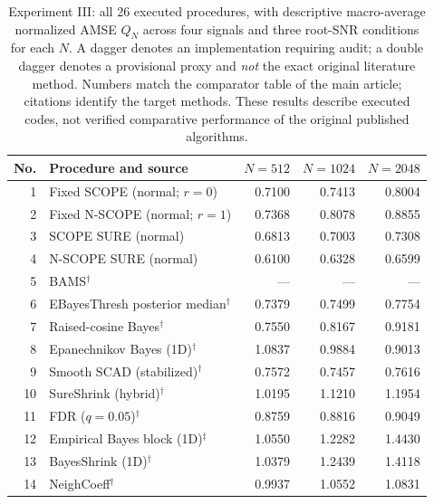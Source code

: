 \documentclass[11pt]{article}
\numberwithin{equation}{section}
\begin{document}
\begin{table}[H]
\centering\small
\caption{Experiment III: all 26 executed procedures, with descriptive macro-average normalized AMSE $Q_N$ across four signals and three root-SNR conditions for each $N$. A dagger denotes an implementation requiring audit; a double dagger denotes a provisional proxy and \emph{not} the exact original literature method. Numbers match the comparator table of the main article; citations identify the target methods. These results describe executed codes, not verified comparative performance of the original published algorithms.}
\label{tab:s5-e3-ranking}
\setlength{\tabcolsep}{5pt}
\begin{tabular}{r p{.58\linewidth}rrr}
\toprule
No. & Procedure and source & $N=512$ & $N=1024$ & $N=2048$ \\
\midrule
1 & Fixed SCOPE (normal; $r=0$) & 0.7100 & 0.7413 & 0.8004 \\
2 & Fixed N-SCOPE (normal; $r=1$) & 0.7368 & 0.8078 & 0.8855 \\
3 & SCOPE SURE (normal) & 0.6813 & 0.7003 & 0.7308 \\
4 & N-SCOPE SURE (normal) & 0.6100 & 0.6328 & 0.6599 \\
5 & BAMS$^{\dagger}$ \citep{VidakovicRuggeri2001} & --- & --- & --- \\
6 & EBayesThresh posterior median$^{\dagger}$ \citep{JohnstoneSilverman2005EBayes} & 0.7379 & 0.7499 & 0.7754 \\
7 & Raised-cosine Bayes$^{\dagger}$ \citep{ReinaSousa2026RaisedCosine} & 0.7550 & 0.8167 & 0.9181 \\
8 & Epanechnikov Bayes (1D)$^{\dagger}$ \citep{BarriosSousa2025Epanechnikov} & 1.0837 & 0.9884 & 0.9013 \\
9 & Smooth SCAD (stabilized)$^{\dagger}$ \citep{KulkarniEtAl2026SmoothSCAD} & 0.7572 & 0.7457 & 0.7616 \\
10 & SureShrink (hybrid)$^{\dagger}$ \citep{DonohoJohnstone1995} & 1.0195 & 1.1210 & 1.1954 \\
11 & FDR ($q=0.05$)$^{\dagger}$ \citep{AbramovichEtAl2006FDR} & 0.8759 & 0.8816 & 0.9049 \\
12 & Empirical Bayes block (1D)$^{\ddagger}$ \citep{AbramovichBesbeasSapatinas2002BlockEB} & 1.0550 & 1.2282 & 1.4430 \\
13 & BayesShrink (1D)$^{\dagger}$ \citep{ChangYuVetterli2000BayesShrink} & 1.0379 & 1.2439 & 1.4118 \\
14 & NeighCoeff$^{\dagger}$ \citep{CaiSilverman2001Neigh} & 0.9937 & 1.0552 & 1.0831 \\

\end{tabular}
\end{table}
\end{document}
